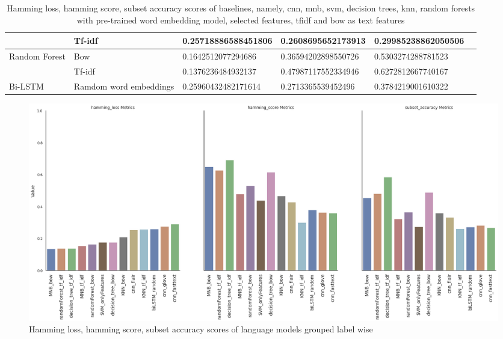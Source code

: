 \begin{table}[h!]
{\begin{tabular}{@{}llrrrr@{}}
\multicolumn{1}{|l|}{} &
  \multicolumn{1}{l|}{Tf-idf} &
  \multicolumn{1}{l|}{0.25718886588451806} &
  \multicolumn{1}{l|}{0.2608695652173913} &
  \multicolumn{1}{l|}{0.29985238862050506}  \\ \midrule
\multicolumn{1}{|l|}{\multirow{2}{*}{Random Forest}} &
  \multicolumn{1}{l|}{Bow} &
  \multicolumn{1}{l|}{0.1642512077294686} &
  \multicolumn{1}{l|}{0.36594202898550726} &
  \multicolumn{1}{l|}{0.5303274288781523} & \\ \cmidrule(l){2-5}
\multicolumn{1}{|l|}{} &
  \multicolumn{1}{l|}{Tf-idf} &
  \multicolumn{1}{l|}{0.1376236484932137} &
  \multicolumn{1}{l|}{0.47987117552334946} &
  \multicolumn{1}{l|}{0.6272812667740167} & \\ \midrule
\multicolumn{1}{|l|}{Bi-LSTM} &
  \multicolumn{1}{l|}{Ramdom word embeddings} &
  \multicolumn{1}{l|}{0.25960432482171614} &
  \multicolumn{1}{l|}{0.2713365539452496} &
  \multicolumn{1}{l|}{0.3784219001610322} \\ \bottomrule
\end{tabular}%
}
\caption{Hamming loss, hamming score, subset accuracy scores of baselines, namely, \acrfull{cnn}, \acrfull{mnb}, \acrfull{svm}, decision trees, \acrfull{knn}, random forests with pre-trained word embedding model, selected features, \acrfull{tfidf} and \acrfull{bow} as text features}
\label{tab:sample_based_baseline}
\end{table}

\begin{figure}[h!]
    \centering
    \includegraphics[width=1\textwidth]{thesis/figures/HHAA_final.png}
    \caption{Hamming loss, hamming score, subset accuracy scores of language models grouped label wise}
    \label{fig:label_wise_hhaa_baselines}
\end{figure}

